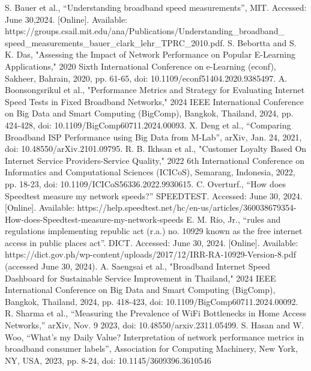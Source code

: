 \documentclass[conference]{IEEEtran}
\begin{document}
\begin{thebibliography}{00}
 S. Bauer et al., “Understanding broadband speed measurements”, MIT. Accessed: June 30,2024. [Online]. Available: https://groups.csail.mit.edu/ana/Publications/Understanding\_broadband\_
speed\_measurements\_bauer\_clark\_lehr\_TPRC\_2010.pdf.
 S. Bebortta and S. K. Das, "Assessing the Impact of Network Performance on Popular E-Learning Applications," 2020 Sixth International Conference on e-Learning (econf), Sakheer, Bahrain, 2020, pp. 61-65, doi: 10.1109/econf51404.2020.9385497.
 A. Boonsongsrikul et al., "Performance Metrics and Strategy for Evaluating Internet Speed Tests in Fixed Broadband Networks," 2024 IEEE International Conference on Big Data and Smart Computing (BigComp), Bangkok, Thailand, 2024, pp. 424-428, doi: 10.1109/BigComp60711.2024.00093.
 X. Deng et al., “Comparing Broadband ISP Performance using Big Data from M-Lab”, arXiv, Jan. 24, 2021, doi: 10.48550/arXiv.2101.09795.
 R. B. Ikhsan et al., "Customer Loyalty Based On Internet Service Providers-Service Quality," 2022 6th International Conference on Informatics and Computational Sciences (ICICoS), Semarang, Indonesia, 2022, pp. 18-23, doi: 10.1109/ICICoS56336.2022.9930615.
 C. Overturf., “How does Speedtest measure my network speeds?” SPEEDTEST. Accessed: June 30, 2024. [Online]. Available: https://help.speedtest.net/hc/en-us/articles/360038679354-How-does-Speedtest-measure-my-network-speeds
 E. M. Rio, Jr.,  “rules and regulations implementing republic act (r.a.) no. 10929 known as the free internet access in public places act”. DICT. Accessed: June 30, 2024. [Online]. Available: https://dict.gov.ph/wp-content/uploads/2017/12/IRR-RA-10929-Version-8.pdf (accessed June 30, 2024).
 A. Saengsai et al., "Broadband Internet Speed Dashboard for Sustainable Service Improvement in Thailand," 2024 IEEE International Conference on Big Data and Smart Computing (BigComp), Bangkok, Thailand, 2024, pp. 418-423, doi: 10.1109/BigComp60711.2024.00092. 
 R. Sharma et al., “Measuring the Prevalence of WiFi Bottlenecks in Home Access Networks,” arXiv, Nov. 9 2023, doi: 10.48550/arxiv.2311.05499.
 S. Hasan and W. Woo, “What's my Daily Value? Interpretation of network performance metrics in broadband consumer labels”, Association for Computing Machinery, New York, NY, USA, 2023, pp. 8-24, doi: 10.1145/3609396.3610546

\end{thebibliography}
\end{document}
